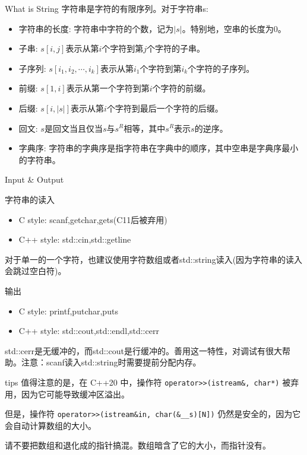\documentclass{ldr-simple-gray}
\begin{document}
  \begin{frame}{What is String}
    字符串是字符的有限序列。对于字符串s:
    \begin{itemize}
      \item 字符串的长度: 字符串中字符的个数，记为$|s|$。特别地，空串的长度为0。
      \item 子串: $s[i,j]$表示从第$i$个字符到第$j$个字符的子串。
      \item 子序列: $s[i_1,i_2,\cdots,i_k]$表示从第$i_1$个字符到第$i_k$个字符的子序列。
      \item 前缀: $s[1,i]$表示从第一个字符到第$i$个字符的前缀。
      \item 后缀: $s[i,|s|]$表示从第$i$个字符到最后一个字符的后缀。
      \item 回文: $s$是回文当且仅当$s$与$s^R$相等，其中$s^R$表示$s$的逆序。
      \item 字典序: 字符串的字典序是指字符串在字典中的顺序，其中空串是字典序最小的字符串。
    \end{itemize}
  \end{frame}

  \begin{frame}{Input \& Output}
    \begin{block}{字符串的读入}
      \begin{itemize}
        \item C style: scanf,getchar,gets(C11后被弃用)
        \item C++ style: std::cin,std::getline
      \end{itemize}
    \end{block}
    对于单一的一个字符，也建议使用字符数组或者std::string读入(因为字符串的读入会跳过空白符)。
    \begin{block}{输出}
      \begin{itemize}
        \item C style: printf,putchar,puts
        \item C++ style: std::cout,std::endl,std::cerr
      \end{itemize}
    \end{block}
    std::cerr是无缓冲的，而std::cout是行缓冲的。善用这一特性，对调试有很大帮助。注意：scanf读入std::string时需要提前分配内存。
  \end{frame}

  \begin{frame}{tips}
    值得注意的是，在 C++20 中，操作符 \texttt{operator>>(istream\&, char*)} 被弃用，因为它可能导致缓冲区溢出。\newline

    但是，操作符 \texttt{operator>>(istream\&in, char(\&\_\_s)[N])} 仍然是安全的，因为它会自动计算数组的大小。\newline
    
    请不要把数组和退化成的指针搞混。数组暗含了它的大小，而指针没有。
  \end{frame}
  
\end{document}
